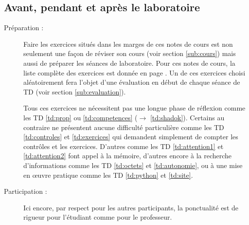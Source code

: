 \subsection{Avant, pendant et après le laboratoire}
\begin{description}
\item[Préparation :] \mbox{}	 
	Faire les exercices situés dans les marges de ces notes de cours
	est non seulement une façon de réviser son cours (voir section \ref{sub:cours})
	mais aussi de préparer les séances de laboratoire.
	Pour ces notes de cours, la liste complète des exercices est donnée en 
	page \pageref{sub:listexo}.
	Un de ces exercices choisi aléatoirement fera l'objet d'une
	évaluation en début de chaque séance de TD (voir section \ref{sub:evaluation}).
	
	Tous ces exercices ne nécessitent pas une longue phase de réflexion comme
	les TD \ref{td:prop} ou \ref{td:competences} ($\rightarrow$ \ref{td:shadok}).
	Certains au contraire ne présentent aucune difficulté particulière
	comme les TD \ref{td:controles} et \ref{td:exercices}
	qui demandent simplement de compter les contrôles et les exercices.
	D'autres comme les TD \ref{td:attention1} et \ref{td:attention2} 
	font appel à la mémoire, d'autres encore à la recherche d'informations
	comme les TD \ref{td:octets} et \ref{td:autonomie}, ou à une mise en
	\oe uvre pratique comme les TD \ref{td:python} et \ref{td:site}.
\item[Participation :] \mbox{}
	Ici encore, par respect pour les autres participants, 
	la ponctualité est de rigueur pour l'étudiant comme pour le professeur.


\end{description}
